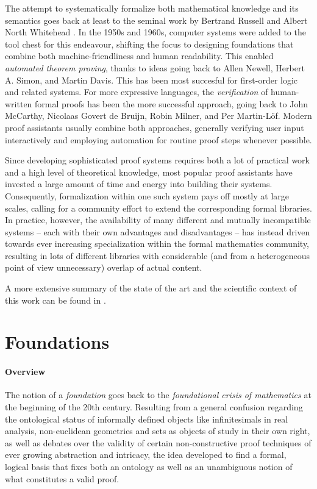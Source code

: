 The attempt to systematically formalize both mathematical knowledge and its semantics goes back at least to the seminal work by Bertrand Russell and Albert North Whitehead \cite{principia}. In the 1950s and 1960s, computer systems were added to the tool chest for this endeavour, shifting the focus to designing foundations that combine both machine-friendliness and human readability. This enabled \emph{automated theorem proving}, thanks to ideas going back to Allen Newell, Herbert A. Simon, and Martin Davis. This has been most succesful for first-order logic and related systems. For more expressive languages, the \emph{verification} of human-written formal proofs has been the more successful approach, going back to 
John McCarthy, Nicolaas Govert de Bruijn, Robin Milner, and Per Martin-L\"of. Modern proof assistants usually combine both approaches, generally verifying user input interactively and employing automation for routine proof steps whenever possible.

Since developing sophisticated proof systems requires both a lot of practical work and a high level of theoretical knowledge, most popular proof assistants have invested a large amount of time and energy into building their systems. Consequently, formalization within one such system pays off mostly at large scales, calling for a community effort to extend the corresponding formal libraries. In practice, however, the availability of many different and mutually incompatible systems -- each with their own advantages and disadvantages -- has instead driven towards ever increasing specialization within the formal mathematics community, resulting in lots of different libraries with considerable (and from a heterogeneous point of view unnecessary) overlap of actual content.\medskip

A more extensive summary of the state of the art and the scientific context of this work can be found in \cite{KohRab:qrtpflmk15}.

\section{Foundations}\label{sec:form}

\paragraph*{Overview} The notion of a \emph{foundation} goes back to the \emph{foundational crisis of mathematics} at the beginning of the 20th century. Resulting from a general confusion regarding the ontological status of informally defined objects like infinitesimals in real analysis, non-euclidean geometries and sets as objects of study in their own right, as well as debates over the validity of certain non-constructive proof techniques of ever growing abstraction and intricacy, the idea developed to find a formal, logical basis that fixes both an ontology as well as an unambiguous notion of what constitutes a valid proof.

